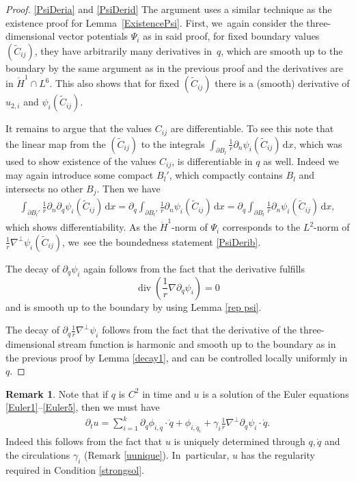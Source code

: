 \documentclass[10pt]{amsart}
\theoremstyle{definition}
\newtheorem{remark}[theorem]{Remark}
\renewcommand{\div}{\operatorname{div}}
\newcommand\eq{=}
\newcommand\dd{\,\mathrm{d}}
\newcommand\dx{\dd x}
\let\de\partial
\begin{document}
\skpt
\begin{proof}

\eqref{PsiDeria} and \eqref{PsiDerid} The argument uses a similar technique as the existence proof for Lem\-ma~\ref{ExistencePsi}. First, we~again consider the three-dimensional vector potentials $\Psi_i$ as in said proof, for fixed boundary values $(\tilde{C}_{ij})$, they have arbitrarily many derivatives in~$q$, which are smooth up to the boundary by the same argument as in the previous proof and the derivatives are in $\dot{H}^1\cap L^6$. This also shows that for fixed $(\tilde{C}_{ij})$ there is a (smooth) derivative of $u_{2,i}$ and $\psi_{i}(\tilde{C}_{ij})$.

It remains to argue that the values $C_{ij}$ are differentiable. To see this note that the linear map from the $(\tilde{C}_{ij})$ to the integrals $\int_{\de B_l}\frac{1}{r}\de_n\psi_i(\tilde{C}_{ij})\dx$, which was used to show existence of the values $C_{ij}$, is differentiable in $q$ as well. Indeed we may again introduce some compact $B_l'$, which compactly contains $B_l$ and intersects no other $B_{j}$. Then we have
\begin{align*}
\int_{\de B_l'}\frac{1}{r}\de_n\de_q\psi_i(\tilde{C}_{ij})\dx\eq\de_q\int_{\de B_l'}\frac{1}{r}\de_n\psi_i(\tilde{C}_{ij})\dx\eq\de_q \int_{\de B_l}\frac{1}{r}\de_n\psi_i(\tilde{C}_{ij})\dx,
\end{align*}
which shows differentiability.
As the $\dot{H}^1$-norm of $\Psi_i$ corresponds to the $L^2$-norm of $\frac{1}{r}\nabla^\perp\psi_i(\tilde{C}_{ij})$, we~see the boundedness statement \eqref{PsiDerib}.

The decay of $\de_q\psi_i$ again follows from the fact that the derivative fulfills
\begin{equation*}\div(\frac{1}{r}\nabla\de_q\psi_i)=0\end{equation*} and is smooth up to the boundary by using Lemma \ref{rep psi}.

The decay of $\de_q \frac{1}{r}\nabla^\perp\psi_i$ follows from the fact that the derivative of the three-dimensional stream function is harmonic and smooth up to the boundary as in the previous proof by Lemma \ref{decay1}, and can be controlled locally uniformly in $q$.
\end{proof}

\begin{remark}
Note that if $q$ is $C^2$ in time and $u$ is a solution of the Euler equations \eqref{Euler1}--\eqref{Euler5}, then we must have
\begin{align}\label{eqDu}
\de_t u\eq \sum_{i=1}^k\de_q \phi_{i,\dot{q}}\cdot\dot{q}+\phi_{i,\ddot{q}_i}+\gamma_i\frac{1}{r}\nabla^\perp\de_q\psi_i\cdot \dot{q}.
\end{align}
Indeed this follows from the fact that $u$ is uniquely determined through $q,\dot{q}$ and the circulations $\gamma_i$ (Remark \ref{uunique}). In~particular, $u$ has the regularity required in Condition \ref{strongsol}.

\end{remark}
\end{document}
